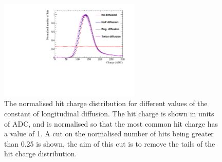 \begin{figure}
  \centering
  \includegraphics[width=0.6\textwidth]{Canvas_ChargeCut_Diffusion}
  \caption[The normalised hit charge distribution for different values of the constant of longitudinal diffusion]
          {The normalised hit charge distribution for different values of the constant of longitudinal diffusion. The hit charge is shown in units of ADC, and is normalised so that the most common hit charge has a value of 1. A cut on the normalised number of hits being greater than 0.25 is shown, the aim of this cut is to remove the tails of the hit charge distribution.}
  \label{fig:DiffLDiff_ChargeCut}
\end{figure}
